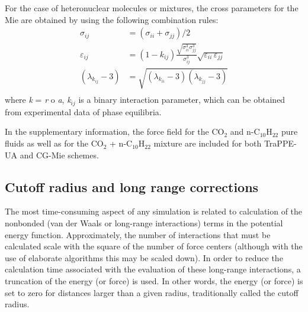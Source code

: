 \documentclass[9pt,bestpractices]{livecoms}
\begin{document}
\begin{mdframed}[linewidth=0pt,backgroundcolor=LiveCoMSLightBlue!8,fontcolor=LiveCoMSDarkBlue!80!black]
For the case of heteronuclear molecules or mixtures, the cross parameters for the Mie are obtained by using the following combination rules:
\begin{align}
  \sigma_{ij} &= \left(\sigma_{ii}+\sigma_{jj}\right)/2 \\
  \varepsilon_{ij} &= \left(1-k_{ij}\right)\frac{\sqrt{\sigma_{ii}^{3}\sigma_{jj}^{3}}}{\sigma_{ij}^{3}}\sqrt{\varepsilon_{ii}\,\varepsilon_{jj}} \\
  \left(\lambda_{k_{ij}}-3\right) &= \sqrt{\left(\lambda_{k_{ii}}-3\right)\left(\lambda_{k_{jj}}-3\right)} \\
\end{align}
where \textit{k} = \textit{r} o \textit{a}, \textit{k}$_{ij}$ is a binary
interaction parameter, which can be obtained from experimental data of phase
equilibria.

In the supplementary information, the force field for the CO$_{2}$ and
n-C$_{10}$H$_{22}$ pure fluids as well as for the CO$_{2}$ + n-C$_{10}$H$_{22}$
mixture are included for both TraPPE-UA and CG-Mie schemes.
\end{mdframed}

\subsection{Cutoff radius and long range corrections} 
\label{sec:cutoff}
The most time-consuming aspect of any simulation is related to calculation of the nonbonded (van
der Waals or long-range interactions) terms in the potential energy function.
Approximately, the number of interactions that must be calculated scale with
the square of the number of force centers (although with the use of elaborate
algorithms this may be scaled down). In order to reduce the calculation time
associated with the evaluation of these long-range interactions, a truncation
of the energy (or force) is used. In other words, the energy (or force) is set
to zero for distances larger than a given radius, traditionally called the
cutoff radius. 
\end{document}
